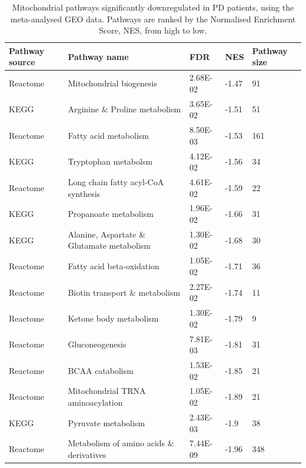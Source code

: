 \documentclass{article}
\begin{document}
\begin{table}[h]
\centering
\label{tab:pathways}
\caption{Mitochondrial pathways significantly downregulated in PD patients, using the meta-analysed GEO data. Pathways are ranked by the Normalised Enrichment Score, NES, from high to low.}
\begin{tabular}{|l|l|l|l|l|}
\hline
Pathway source & Pathway name                                   & FDR      & NES   & Pathway size \\ \hline
Reactome       & Mitochondrial biogenesis                       & 2.68E-02 & -1.47 & 91           \\ \hline
KEGG           & Arginine \& Proline metabolism                 & 3.65E-02 & -1.51 & 51           \\ \hline
Reactome       & Fatty acid metabolism                          & 8.50E-03 & -1.53 & 161          \\ \hline
KEGG           & Tryptophan metabolsm                           & 4.12E-02 & -1.56 & 34           \\ \hline
Reactome       & Long chain fatty acyl-CoA synthesis            & 4.61E-02 & -1.59 & 22           \\ \hline
KEGG           & Propanoate metabolism                          & 1.96E-02 & -1.66 & 31           \\ \hline
KEGG           & Alanine, Aspartate \& Glutamate metabolism     & 1.30E-02 & -1.68 & 30           \\ \hline
Reactome       & Fatty acid beta-oxidation                      & 1.05E-02 & -1.71 & 36           \\ \hline
Reactome       & Biotin transport \& metabolism                 & 2.27E-02 & -1.74 & 11           \\ \hline
Reactome       & Ketone body metabolism                         & 1.30E-02 & -1.79 & 9            \\ \hline
Reactome       & Gluconeogenesis                                & 7.81E-03 & -1.81 & 31           \\ \hline
Reactome       & BCAA catabolism                                & 1.53E-02 & -1.85 & 21           \\ \hline
Reactome       & Mitochondrial TRNA aminoacylation              & 1.05E-02 & -1.89 & 21           \\ \hline
KEGG           & Pyruvate metabolism                            & 2.43E-03 & -1.9  & 38           \\ \hline
Reactome       & Metabolism of amino acids \& derivatives       & 7.44E-09 & -1.96 & 348          \\ \hline

\end{tabular}
\end{table}
\end{document}
